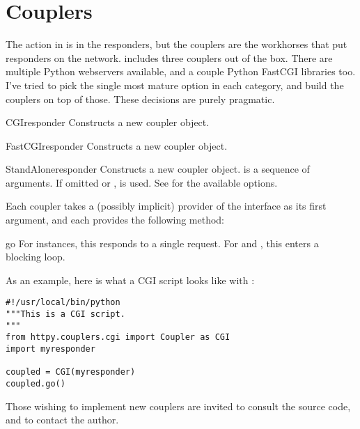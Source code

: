 \section{Couplers \label{couplers}}

The action in  is in the responders, but the couplers are the
workhorses that put responders on the network.  includes three
couplers out of the box. There are multiple Python webservers available, and a
couple Python FastCGI libraries too. I've tried to pick the single most mature
option in each category, and build the couplers on top of those. These decisions
are purely pragmatic.

\begin{classdesc}{CGI}{responder} Constructs a new  coupler object.
\end{classdesc}

\begin{classdesc}{FastCGI}{responder} Constructs a new  coupler
object.
\end{classdesc}

\begin{classdesc}{StandAlone}{responder} Constructs a new
 coupler object.  is a sequence of arguments. If
omitted or ,  is used. See  for the available options.
\end{classdesc}

Each coupler takes a (possibly implicit) provider of the 
interface as its first argument, and each provides the following method:

\begin{methoddesc}{go}{} For  instances, this responds to a single
request. For  and , this enters a blocking
loop.\end{methoddesc}

As an example, here is what a CGI script looks like with :

\begin{verbatim}
#!/usr/local/bin/python
"""This is a CGI script.
"""
from httpy.couplers.cgi import Coupler as CGI
import myresponder

coupled = CGI(myresponder)
coupled.go()
\end{verbatim}

Those wishing to implement new couplers are invited to consult the source code,
and to contact the author.